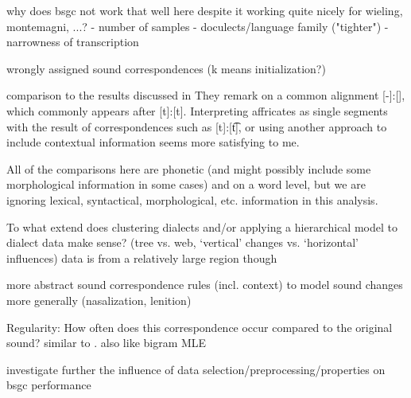 \documentclass[a4paper]{article}
\begin{document}
why does bsgc not work that well here despite it working quite nicely for wieling, montemagni, ...?
- number of samples
- doculects/language family ("tighter")
- narrowness of transcription

wrongly assigned sound correspondences (k means initialization?)

comparison to the results discussed in \citet{wieling2011bipartite}
They remark on a common alignment [-]:[\textesh], which commonly appears after [t]:[t]. Interpreting affricates as single segments with the result of correspondences such as [t]:[\t{t\textesh}], or using another approach to include contextual information seems more satisfying to me.


All of the comparisons here are phonetic (and might possibly include some morphological information in some cases) and on a word level, but we are ignoring lexical, syntactical, morphological, etc. information in this analysis.

To what extend does clustering dialects and/or applying a hierarchical model to dialect data make sense? (tree vs. web, `vertical' changes vs. `horizontal' influences)
data is from a relatively large region though

more abstract sound correspondence rules (incl. context) to model sound changes more generally (nasalization, lenition)

Regularity: How often does this correspondence occur compared to the original sound? similar to \citet{prokic2013combining}. also like bigram MLE

investigate further the influence of data selection/preprocessing/properties on bsgc performance



\end{document}
